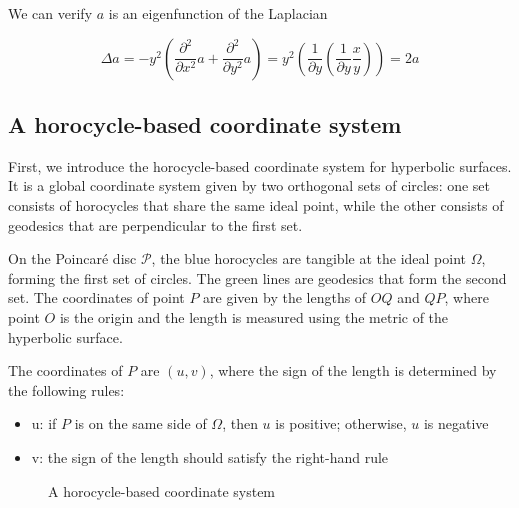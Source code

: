 We can verify $a$ is an eigenfunction of the Laplacian

$$
\Delta a = - y^2 (\frac{\partial^2}{\partial x^2} a + \frac{\partial^2}{\partial y^2} a) = y^2 (\frac{1}{\partial y} (\frac{1}{\partial y} \frac{x}{y})) = 2 a
$$

\subsection{A horocycle-based coordinate system}\label{subsec:horocyclebased}

First, we introduce the horocycle-based coordinate system for hyperbolic surfaces.
It is a global coordinate system given by two orthogonal sets of circles: one set consists of horocycles that share the same ideal point,
while the other consists of geodesics that are perpendicular to the first set.

On the Poincaré disc $\mathcal{P}$, the blue horocycles are tangible at the ideal point $\Omega$, forming the first set of circles.
The green lines are geodesics that form the second set. The coordinates of point $P$ are given by the lengths of $OQ$ and $QP$,
where point $O$ is the origin and the length is measured using the metric of the hyperbolic surface.

The coordinates of $P$ are $(u,v)$, where the sign of the length is determined by the following rules:
\begin{itemize}
\item u: if $P$ is on the same side of $\Omega$, then $u$ is positive; otherwise, $u$ is negative
\item v: the sign of the length should satisfy the right-hand rule
\end{itemize}

\begin{figure}[ht]
\centering
{}
\caption{A horocycle-based coordinate system}\label{fig:horocyclecoord}
\end{figure}

